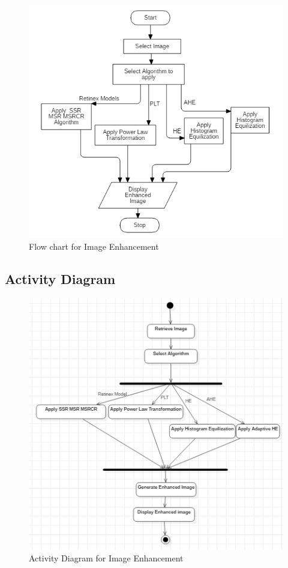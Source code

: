 \begin{figure}[!htb]
	\centering
	\includegraphics[scale=0.6]{images/ch4/flowChart.png}
	\caption{Flow chart for Image Enhancement}
	\label{fig:flowChart}
\end{figure}


\subsection{Activity Diagram}

\begin{figure}[!htb]
	\centering
	\includegraphics[scale=0.7]{images/ch4/activity.png}
	\caption{Activity Diagram for Image Enhancement}
	\label{fig:activity}
\end{figure}


